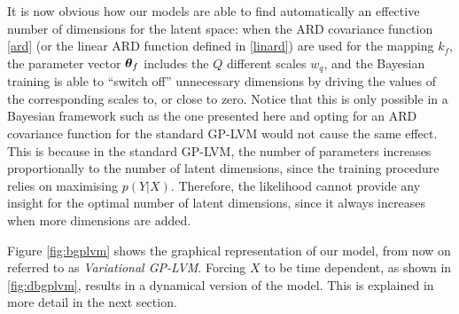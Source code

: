 \documentclass [10pt , a4paper]{article}
\begin{document}
\par
It is now obvious how our models
are able to find automatically an effective number of dimensions for the latent space:
when the ARD covariance function \eqref{ard} (or the linear ARD function defined in \eqref{linard}) are used for the mapping
$k_f$, the parameter vector $\boldsymbol \theta_f$ includes the $Q$ different scales $w_q$,
and the Bayesian training is able to ``switch off'' unnecessary dimensions by driving the values of the corresponding
scales to, or close to zero. Notice that this is only possible in a Bayesian framework such as the one presented here and
opting for an ARD covariance function for the standard GP-LVM would not cause the same effect. This is because in the standard
GP-LVM, the number of parameters increases proportionally to the number of latent dimensions, since the training procedure
relies on maximising $p(Y|X)$. Therefore, the likelihood cannot provide any insight for the optimal number of latent dimensions,
since it always increases when more dimensions are added.
\par Figure \ref{fig:bgplvm} shows the graphical representation of our model, from now on referred to as \textit{Variational GP-LVM}.
Forcing $X$ to be time dependent, as shown in \ref{fig:dbgplvm}, results in a dynamical version of the model. This is
 explained in more detail in the next section.
\end{document}
